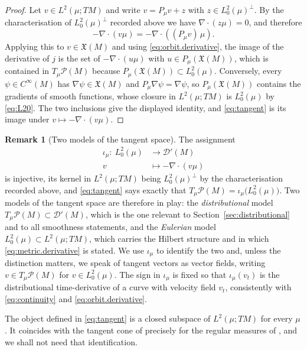 \documentclass[11pt,reqno]{amsart}
\theoremstyle{plain}
\theoremstyle{definition}
\newtheorem{rmk}[thm]{Remark}
\newcommand{\lto}{\longrightarrow}
\newcommand{\Prob}{\mathcal{P}}
\newcommand{\Dist}{\mathcal{D}'}
\begin{document}
\begin{proof}
    Let \( v\in L^2(\mu;TM) \) and write \( v=P_\mu v+z \) with \( z\in L^2_0(\mu)^\perp \).
    By the characterisation of \( L^2_0(\mu)^\perp \) recorded above we have \( \nabla\!\cdot(z\mu)=0 \), and therefore
    \[
        -\nabla\!\cdot(v\mu)=-\nabla\!\cdot\left((P_\mu v)\,\mu\right).
    \]
    Applying this to \( v\in\mathfrak X(M) \) and using \eqref{eq:orbit.derivative}, the image of the derivative of \( j \) is the set of \( -\nabla\!\cdot(u\mu) \) with \( u\in P_\mu(\mathfrak X(M)) \), which is contained in \( T_\mu\Prob(M) \) because \( P_\mu(\mathfrak X(M))\subset L^2_0(\mu) \).
    Conversely, every \( \psi\in C^\infty(M) \) has \( \nabla\psi\in\mathfrak X(M) \) and \( P_\mu\nabla\psi=\nabla\psi \), so \( P_\mu(\mathfrak X(M)) \) contains the gradients of smooth functions, whose closure in \( L^2(\mu;TM) \) is \( L^2_0(\mu) \) by \eqref{eq:L20}.
    The two inclusions give the displayed identity, and \eqref{eq:tangent} is its image under \( v\mapsto-\nabla\!\cdot(v\mu) \).
\end{proof}

\begin{rmk}[Two models of the tangent space]\label{rmk:two.models}
    The assignment
    \[
        \begin{split}
            \iota_\mu:\ L^2_0(\mu)&\lto\Dist(M) \\
            v &\mapsto -\nabla\!\cdot(v\mu)
        \end{split}
    \]
    is injective, its kernel in \( L^2(\mu;TM) \) being \( L^2_0(\mu)^\perp \) by the characterisation recorded above, and \eqref{eq:tangent} says exactly that \( T_\mu\Prob(M)=\iota_\mu\big(L^2_0(\mu)\big) \).
    Two models of the tangent space are therefore in play: the \emph{distributional} model \( T_\mu\Prob(M)\subset\Dist(M) \), which is the one relevant to Section~\ref{sec:distributional} and to all smoothness statements, and the \emph{Eulerian} model \( L^2_0(\mu)\subset L^2(\mu;TM) \), which carries the Hilbert structure and in which \eqref{eq:metric.derivative} is stated.
    We use \( \iota_\mu \) to identify the two and, unless the distinction matters, we speak of tangent vectors as vector fields, writing \( v\in T_\mu\Prob(M) \) for \( v\in L^2_0(\mu) \).
    The sign in \( \iota_\mu \) is fixed so that \( \iota_\mu(v_t) \) is the distributional time-derivative of a curve with velocity field \( v_t \), consistently with \eqref{eq:continuity} and \eqref{eq:orbit.derivative}.

    The object defined in \eqref{eq:tangent} is a closed subspace of \(L^2(\mu;TM)\) for every \(\mu\).
    It coincides with the tangent cone of \cite{gigli_second_2012} precisely for the regular measures of \cite{gigli_inverse_2011}, and we shall not need that identification.
\end{rmk}
    
\end{document}
